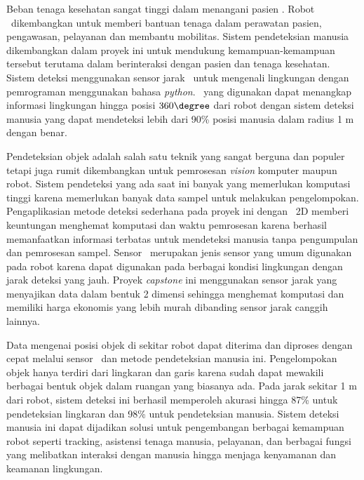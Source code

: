 
Beban tenaga kesehatan sangat tinggi dalam menangani pasien \covid. Robot \covid\ dikembangkan untuk memberi bantuan tenaga dalam perawatan pasien, pengawasan, pelayanan dan membantu mobilitas. Sistem pendeteksian manusia dikembangkan dalam proyek ini untuk mendukung kemampuan-kemampuan tersebut terutama dalam berinteraksi dengan pasien dan tenaga kesehatan. Sistem deteksi menggunakan sensor jarak \lidar\ untuk mengenali lingkungan dengan pemrograman menggunakan bahasa \textit{python}. \lidar\ yang digunakan dapat menangkap informasi lingkungan hingga posisi $360\degree$ dari robot dengan sistem deteksi manusia yang dapat mendeteksi lebih dari 90\% posisi manusia dalam radius 1 m dengan benar.

Pendeteksian objek adalah salah satu teknik yang sangat berguna dan populer tetapi juga rumit dikembangkan untuk pemrosesan \textit{vision} komputer maupun robot. Sistem pendeteksi yang ada saat ini banyak yang memerlukan komputasi tinggi karena memerlukan banyak data sampel untuk melakukan pengelompokan. Pengaplikasian metode deteksi sederhana pada proyek ini dengan \lidar\ 2D memberi keuntungan menghemat komputasi dan waktu pemrosesan karena berhasil memanfaatkan informasi terbatas untuk mendeteksi manusia tanpa pengumpulan dan pemrosesan sampel. 
Sensor \lidar\ merupakan jenis sensor yang umum digunakan pada robot karena dapat digunakan pada berbagai kondisi lingkungan dengan jarak deteksi yang jauh. Proyek \textit{capstone} ini menggunakan sensor jarak yang menyajikan data dalam bentuk 2 dimensi sehingga menghemat komputasi dan memiliki harga ekonomis yang lebih murah dibanding sensor jarak canggih lainnya.  

Data mengenai posisi objek di sekitar robot dapat diterima dan diproses dengan cepat melalui sensor \lidar\ dan metode pendeteksian manusia ini. Pengelompokan objek hanya terdiri dari lingkaran dan garis karena sudah dapat mewakili berbagai bentuk objek dalam ruangan yang biasanya ada. Pada jarak sekitar 1 m dari robot, sistem deteksi ini berhasil memperoleh akurasi hingga 87\% untuk pendeteksian lingkaran dan 98\% untuk pendeteksian manusia. 
Sistem deteksi manusia ini dapat dijadikan solusi untuk pengembangan berbagai kemampuan robot seperti tracking, asistensi tenaga manusia, pelayanan, dan berbagai fungsi yang melibatkan interaksi dengan manusia hingga menjaga kenyamanan dan keamanan lingkungan.





